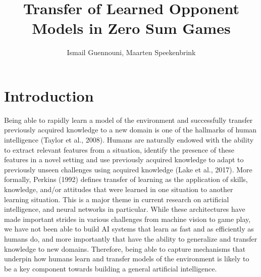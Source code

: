 \documentclass[12pt]{article}         %
\title{Transfer of Learned Opponent Models in Zero Sum Games}  %
\author{Ismail Guennouni, Maarten Speekenbrink}             %
\begin{document}



\maketitle              %




\section*{Introduction}

Being able to rapidly learn a model of the environment and successfully transfer previously acquired knowledge to a new domain is one of the hallmarks of human intelligence (Taylor et al., 2008). Humans are naturally endowed with the ability to extract relevant features from a situation, identify the presence of these features in a novel setting and use previously acquired knowledge to adapt to previously unseen challenges using acquired knowledge (Lake et al., 2017). More formally, Perkins (1992) defines transfer of learning as the application of skills, knowledge, and/or attitudes that were learned in one situation to another learning situation. This is a major theme in current research on artificial intelligence, and neural networks in particular. While these architectures have made important strides in various challenges from machine vision to game play, we have not been able to build AI systems that learn as fast and as efficiently as humans do, and more importantly that have the ability to generalize and transfer knowledge to new domains. Therefore, being able to capture mechanisms that underpin how humans learn and transfer models of the environment is likely to be a key component towards building a general artificial intelligence.
\end{document}
